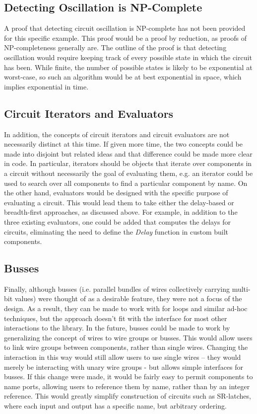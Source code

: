 \documentclass{article}
\newcommand{\FunctionName}[1]{\textit{#1}}
\begin{document}
\subsection{Detecting Oscillation is NP-Complete}
A proof that detecting circuit oscillation is NP-complete has not been provided for this specific example. This proof would be a proof by reduction, as proofs of NP-completeness generally are. The outline of the proof is that detecting oscillation would require keeping track of every possible state in which the circuit has been. While finite, the number of possible states is likely to be exponential at worst-case, so such an algorithm would be at best exponential in space, which implies exponential in time.

\subsection{Circuit Iterators and Evaluators}
In addition, the concepts of circuit iterators and circuit evaluators are not necessarily distinct at this time. If given more time, the two concepts could be made into disjoint but related ideas and that difference could be made more clear in code. In particular, iterators should be objects that iterate over components in a circuit without necessarily the goal of evaluating them, e.g. an iterator could be used to search over all components to find a particular component by name. On the other hand, evaluators would be designed with the specific purpose of evaluating a circuit. This would lead them to take either the delay-based or breadth-first approaches, as discussed above. For example, in addition to the three existing evaluators, one could be added that computes the delays for circuits, eliminating the need to define the \FunctionName{Delay} function in custom built components.

\subsection{Busses}
Finally, although busses (i.e. parallel bundles of wires collectively carrying multi-bit values) were thought of as a desirable feature, they were not a focus of the design. As a result, they can be made to work with for loops and similar ad-hoc techniques, but the approach doesn’t fit with the interface for most other interactions to the library. In the future, busses could be made to work by generalizing the concept of wires to wire groups or busses. This would allow users to link wire groups between components, rather than single wires. Changing the interaction in this way would still allow users to use single wires -- they would merely be interacting with unary wire groups - but allows simple interfaces for busses. If this change were made, it would be fairly easy to permit components to name ports, allowing users to reference them by name, rather than by an integer reference. This would greatly simplify construction of circuits such as SR-latches, where each input and output has a specific name, but
arbitrary ordering.
\end{document}
